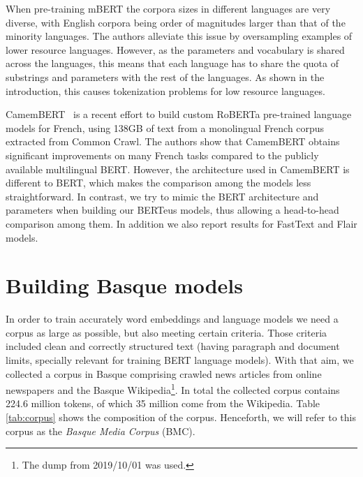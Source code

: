 \documentclass[10pt, a4paper]{article}
\begin{document}
When pre-training mBERT the corpora sizes in different languages are very diverse, with English corpora being order of magnitudes larger than that of the minority languages. The authors alleviate this issue by oversampling examples of lower resource languages. However, as the parameters and vocabulary is shared across the languages, this means that each language has to share the quota of substrings and parameters with the rest of the languages. As shown in the introduction, this causes tokenization problems for low resource languages.

CamemBERT~\cite{martin2019camembert} is a recent effort to build custom RoBERTa \cite{liu2019roberta} pre-trained language models for French, using 138GB of text from a monolingual French corpus extracted from Common Crawl. The authors show that CamemBERT obtains significant improvements on many French tasks compared to the publicly available multilingual BERT. However, the architecture used in CamemBERT is different to BERT, which makes the comparison among the models less straightforward. In contrast, we try to mimic the BERT architecture and parameters when building our BERTeus models, thus allowing a head-to-head comparison among them. In addition we also report results for FastText and Flair models.

\section{Building Basque models}\label{sec:build-basq-models}


In order to train accurately word embeddings and language models we need a corpus as large as possible, but also meeting certain criteria. Those criteria included clean and correctly structured text (having paragraph and document limits, specially relevant for training BERT language models). With that aim, we collected a corpus in Basque comprising crawled news articles from online newspapers and the Basque Wikipedia\footnote{The dump from 2019/10/01 was used.}. In total the collected corpus contains 224.6 million tokens, of which 35 million come from the Wikipedia. Table \ref{tab:corpus} shows the composition of the corpus. Henceforth, we will refer to this corpus as the \emph{Basque Media Corpus} (BMC).
\end{document}
